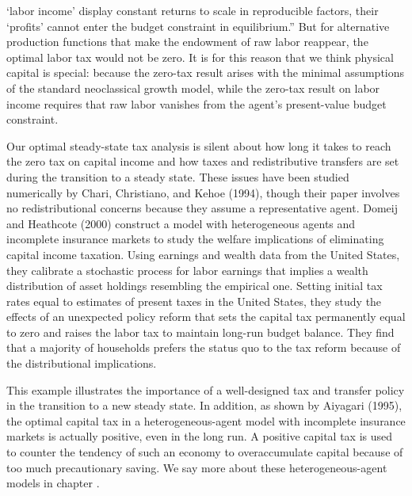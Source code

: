 `labor income' display constant returns to scale in
reproducible factors, their `profits' cannot enter the
budget constraint in equilibrium.'' But for alternative production
functions that make the endowment of raw labor reappear,
the optimal labor tax
would not be zero. It is for this reason that we think physical
capital is special: because the zero-tax result arises with
the minimal assumptions of the standard neoclassical growth
model, while the zero-tax result on labor income requires
that raw labor vanishes from the agent's present-value
budget constraint.

  
 
Our optimal steady-state tax analysis
is silent about how long it takes to reach
the zero tax on capital income and how taxes and
 redistributive transfers are set during the transition
to a steady state. These issues have been  studied numerically
by Chari, Christiano, and Kehoe (1994),
though their paper  involves no redistributional
concerns because they assume a representative agent.
Domeij and Heathcote (2000)
construct a model with heterogeneous agents and incomplete
insurance markets to study the welfare implications
of eliminating capital income taxation.
Using earnings and wealth data from the United States,
they calibrate a stochastic process for labor earnings
that implies a wealth distribution of asset holdings
resembling the empirical one. Setting initial tax rates
equal to estimates of present taxes in the United States,
they study the effects of an unexpected policy reform
that sets the capital tax permanently equal to zero and
raises the labor tax to maintain long-run budget balance.
They find that a majority of households prefers
the  status quo to the tax reform because of the
distributional implications.

This example illustrates
the importance of a well-designed tax and transfer policy in the
transition to a new steady state.  In addition, as shown by Aiyagari (1995),
the optimal capital tax in a heterogeneous-agent model with incomplete
insurance markets is actually positive, even in the long run.
A positive capital tax is used to counter the tendency of
such an economy to overaccumulate capital because of too much
precautionary saving. We say  more about these heterogeneous-agent
models in chapter .%

